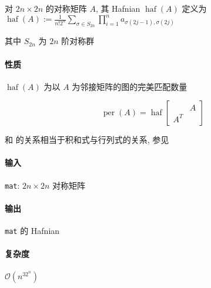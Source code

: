 对 \(2n\times 2n\) 的对称矩阵 \(A\), 其 Hafnian \(\operatorname{haf}(A)\) 定义为 \(\displaystyle\operatorname{haf}(A):=\frac{1}{n!2^n}\sum_{\sigma\in S_{2n}}\prod_{i=1}^n a_{\sigma(2j-1),\sigma(2j)}\)

其中 \(S_{2n}\) 为 \(2n\) 阶对称群

\paragraph{性质}

\(\operatorname{haf}(A)\) 为以 \(A\) 为邻接矩阵的图的完美匹配数量

\[
    \operatorname{per}(A)=\operatorname{haf}\begin{bmatrix}
            & A \\
        A^T &
    \end{bmatrix}
\]

和  的关系相当于积和式与行列式的关系, 参见 

\paragraph{输入}

\verb|mat|: \(2n\times 2n\) 对称矩阵

\paragraph{输出}

\verb|mat| 的 Hafnian

\paragraph{复杂度}

\(\mathcal{O}(n^32^n)\)
